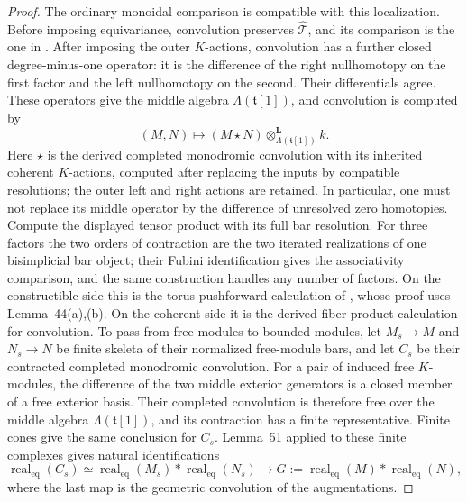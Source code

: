 \documentclass[11pt]{article}
\numberwithin{equation}{section}
\theoremstyle{definition}
\theoremstyle{remark}
\begin{document}
\begin{proof}
The ordinary monoidal comparison is compatible with this
localization.  Before imposing equivariance, convolution preserves
$\widehat{\mathcal T}$, and its comparison is the one in
\cite[Proposition~7(b) and Section~10.2]{Enh:Bezrukavnikov}.
After imposing the outer $K$-actions, convolution has a further
closed degree-minus-one operator: it is the difference of the right
nullhomotopy on the first factor and the left nullhomotopy on the
second.  Their differentials agree.  These operators give the middle
algebra $\Lambda(\mathfrak t[1])$, and convolution is computed by
\[
 (M,N)\longmapsto
 (M\star N)\mathbin{\otimes}^{\mathbf L}_{\Lambda(\mathfrak t[1])}k.
\]
Here $\star$ is the derived completed monodromic convolution with
its inherited coherent $K$-actions, computed after replacing the
inputs by compatible resolutions; the outer left and right actions
are retained.  In particular, one must not replace its middle
operator by the difference of unresolved zero homotopies.
Compute the displayed tensor
product with its full bar resolution.  For three factors the two
orders of contraction are the two iterated realizations of one
bisimplicial bar object; their Fubini identification gives the
associativity comparison, and the same construction handles any
number of factors.  On the constructible side this is the torus
pushforward calculation of
\cite[Lemma~51]{Enh:Bezrukavnikov}, whose proof uses Lemma~44(a),(b).
On the coherent side it is the derived fiber-product calculation
for convolution.  To pass from free modules to bounded modules, let $M_s\to M$ and
$N_s\to N$ be finite skeleta of their normalized free-module bars,
and let $C_s$ be their contracted completed monodromic convolution.
For a pair of induced free $K$-modules, the difference of the two
middle exterior generators is a closed member of a free exterior
basis.  Their completed convolution is therefore free over the
middle algebra $\Lambda(\mathfrak t[1])$, and its contraction has
a finite representative.  Finite cones give the same conclusion
for $C_s$.  Lemma~51 applied to these finite complexes gives natural
identifications
\[
 \operatorname{real}_{\mathrm{eq}}(C_s)
 \simeq
 \operatorname{real}_{\mathrm{eq}}(M_s)
       *\operatorname{real}_{\mathrm{eq}}(N_s)
 \longrightarrow
 G:=\operatorname{real}_{\mathrm{eq}}(M)
       *\operatorname{real}_{\mathrm{eq}}(N),
\]
where the last map is the geometric convolution of the augmentations.


\end{proof}
\end{document}
